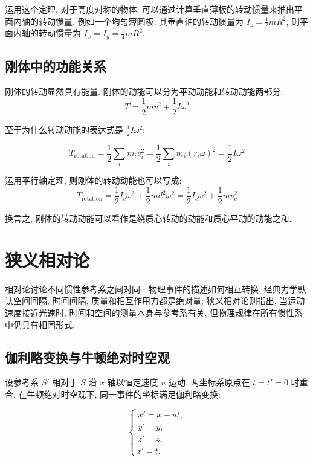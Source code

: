 \documentclass[
  a4paper,
]{ctexrep}
\begin{document}
运用这个定理, 对于高度对称的物体,
可以通过计算垂直薄板的转动惯量来推出平面内轴的转动惯量.
例如一个均匀薄圆板, 其垂直轴的转动惯量为 \(I_z = \frac{1}{2}mR^2\),
则平面内轴的转动惯量为 \(I_x = I_y = \frac{1}{4}mR^2\).

\section{刚体中的功能关系}\label{ux521aux4f53ux4e2dux7684ux529fux80fdux5173ux7cfb}

刚体的转动显然具有能量. 刚体的动能可以分为平动动能和转动动能两部分: \[
T = \frac{1}{2}mv^2 + \frac{1}{2}I\omega^2
\]

至于为什么转动动能的表达式是 \(\frac{1}{2}I\omega^2\):

\[
T_\text{rotation} = \frac{1}{2} \sum_i m_i v_i^2 = \frac{1}{2} \sum_i m_i (r_i \omega)^2 = \frac{1}{2} I \omega^2
\]

运用平行轴定理, 则刚体的转动动能也可以写成: \[
T_\text{rotation} = \frac{1}{2} I_c \omega^2 + \frac{1}{2} m d^2 \omega^2 = \frac{1}{2} I_c \omega^2 + \frac{1}{2} m v_c^2
\]

换言之, 刚体的转动动能可以看作是绕质心转动的动能和质心平动的动能之和.

\chapter{狭义相对论}\label{ux72edux4e49ux76f8ux5bf9ux8bba}

相对论讨论不同惯性参考系之间对同一物理事件的描述如何相互转换.
经典力学默认空间间隔, 时间间隔, 质量和相互作用力都是绝对量;
狭义相对论则指出, 当运动速度接近光速时,
时间和空间的测量本身与参考系有关,
但物理规律在所有惯性系中仍具有相同形式.

\section{伽利略变换与牛顿绝对时空观}\label{ux4f3dux5229ux7565ux53d8ux6362ux4e0eux725bux987fux7eddux5bf9ux65f6ux7a7aux89c2}

设参考系 \(S'\) 相对于 \(S\) 沿 \(x\) 轴以恒定速度 \(u\) 运动,
两坐标系原点在 \(t=t'=0\) 时重合. 在牛顿绝对时空观下,
同一事件的坐标满足伽利略变换:

\[
\begin{cases}
x' = x - ut, \\
y' = y, \\
z' = z, \\
t' = t.
\end{cases}
\]
\end{document}
